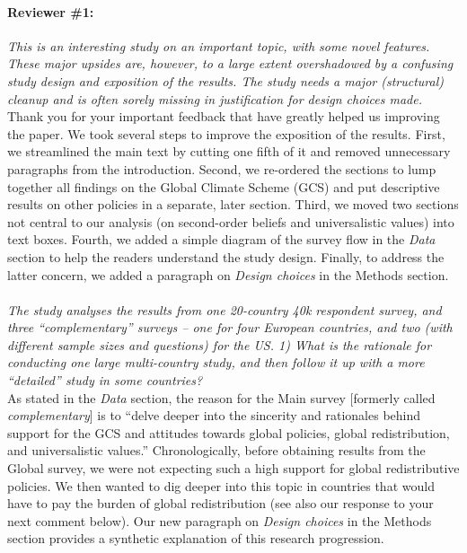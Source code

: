 \documentclass[12pt,english]{article}
\begin{document}



\clearpage
\paragraph*{Reviewer \#1:}
\textit{This is an interesting study on an important topic, with some novel features. These major upsides are, however, to a large extent overshadowed by a confusing study design and exposition of the results. The study needs a major (structural) cleanup and is often sorely missing in justification for design choices made.}~\\

Thank you for your important feedback that have greatly helped us improving the paper. We took several steps to improve the exposition of the results. First, we streamlined the main text by cutting one fifth of it and removed unnecessary paragraphs from the introduction. Second, we re-ordered the sections to lump together all findings on the Global Climate Scheme (GCS) and put descriptive results on other policies in a separate, later section. Third, we moved two sections not central to our analysis (on second-order beliefs and universalistic values) into text boxes. Fourth, we added a simple diagram of the survey flow in the \textit{Data} section to help the readers understand the study design. 
Finally, to address the latter concern, we added a paragraph on \textit{Design choices} in the Methods section.
~\\~\\

\textit{The study analyses the results from one 20-country 40k respondent survey, and three “complementary” surveys – one for four European countries, and two (with different sample sizes and questions) for the US.
1) What is the rationale for conducting one large multi-country study, and then follow it up with a more “detailed” study in some countries?}~\\

As stated in the \textit{Data} section, the reason for the Main survey [formerly called \textit{complementary}] is to ``delve deeper into the sincerity and rationales behind support for the GCS and attitudes towards global policies, global redistribution, and universalistic values.'' Chronologically, before obtaining results from the Global survey, we were not expecting such a high support for global redistributive policies. We then wanted to dig deeper into this topic in countries that would have to pay the burden of global redistribution (see also our response to your next comment below). Our new paragraph on \textit{Design choices} in the Methods section provides a synthetic explanation of this research progression.
~\\ ~\\
\end{document}
